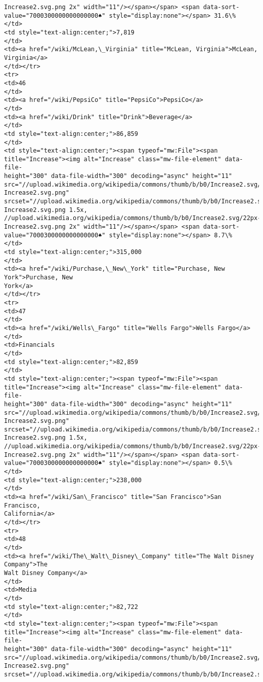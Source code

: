\documentclass[11pt]{article}
\begin{document}
\begin{Verbatim}[commandchars=\\\{\}]
Increase2.svg.png 2x" width="11"/></span></span> <span data-sort-
value="7000300000000000000♠" style="display:none"></span> 31.6\%
</td>
<td style="text-align:center;">7,819
</td>
<td><a href="/wiki/McLean,\_Virginia" title="McLean, Virginia">McLean,
Virginia</a>
</td></tr>
<tr>
<td>46
</td>
<td><a href="/wiki/PepsiCo" title="PepsiCo">PepsiCo</a>
</td>
<td><a href="/wiki/Drink" title="Drink">Beverage</a>
</td>
<td style="text-align:center;">86,859
</td>
<td style="text-align:center;"><span typeof="mw:File"><span
title="Increase"><img alt="Increase" class="mw-file-element" data-file-
height="300" data-file-width="300" decoding="async" height="11"
src="//upload.wikimedia.org/wikipedia/commons/thumb/b/b0/Increase2.svg/11px-
Increase2.svg.png"
srcset="//upload.wikimedia.org/wikipedia/commons/thumb/b/b0/Increase2.svg/17px-
Increase2.svg.png 1.5x,
//upload.wikimedia.org/wikipedia/commons/thumb/b/b0/Increase2.svg/22px-
Increase2.svg.png 2x" width="11"/></span></span> <span data-sort-
value="7000300000000000000♠" style="display:none"></span> 8.7\%
</td>
<td style="text-align:center;">315,000
</td>
<td><a href="/wiki/Purchase,\_New\_York" title="Purchase, New York">Purchase, New
York</a>
</td></tr>
<tr>
<td>47
</td>
<td><a href="/wiki/Wells\_Fargo" title="Wells Fargo">Wells Fargo</a>
</td>
<td>Financials
</td>
<td style="text-align:center;">82,859
</td>
<td style="text-align:center;"><span typeof="mw:File"><span
title="Increase"><img alt="Increase" class="mw-file-element" data-file-
height="300" data-file-width="300" decoding="async" height="11"
src="//upload.wikimedia.org/wikipedia/commons/thumb/b/b0/Increase2.svg/11px-
Increase2.svg.png"
srcset="//upload.wikimedia.org/wikipedia/commons/thumb/b/b0/Increase2.svg/17px-
Increase2.svg.png 1.5x,
//upload.wikimedia.org/wikipedia/commons/thumb/b/b0/Increase2.svg/22px-
Increase2.svg.png 2x" width="11"/></span></span> <span data-sort-
value="7000300000000000000♠" style="display:none"></span> 0.5\%
</td>
<td style="text-align:center;">238,000
</td>
<td><a href="/wiki/San\_Francisco" title="San Francisco">San Francisco,
California</a>
</td></tr>
<tr>
<td>48
</td>
<td><a href="/wiki/The\_Walt\_Disney\_Company" title="The Walt Disney Company">The
Walt Disney Company</a>
</td>
<td>Media
</td>
<td style="text-align:center;">82,722
</td>
<td style="text-align:center;"><span typeof="mw:File"><span
title="Increase"><img alt="Increase" class="mw-file-element" data-file-
height="300" data-file-width="300" decoding="async" height="11"
src="//upload.wikimedia.org/wikipedia/commons/thumb/b/b0/Increase2.svg/11px-
Increase2.svg.png"
srcset="//upload.wikimedia.org/wikipedia/commons/thumb/b/b0/Increase2.svg/17px-

\end{Verbatim}
\end{document}
